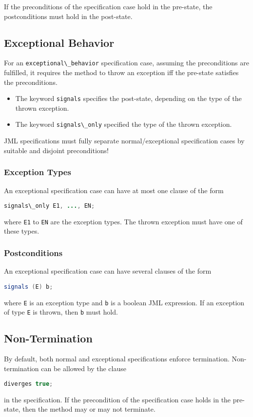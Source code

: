 \documentclass[a4paper, 11pt, accentcolor = tud3b]{tudreport}
\newcommand{\inlineJava}[1]{\lstinline[language = Java]|#1|}
\begin{document}
					If the preconditions of the specification case hold in the pre-state, the postconditions must hold in the post-state.

			\subsection{Exceptional Behavior}
				For an \inlineJava{exceptional\_behavior} specification case, assuming the preconditions are fulfilled, it requires the method to throw an exception iff the pre-state satisfies the preconditions.
				\begin{itemize}
					\item The keyword \inlineJava{signals} specifies the post-state, depending on the type of the thrown exception.
					\item The keyword \inlineJava{signals\_only} specified the type of the thrown exception.
				\end{itemize}
				JML specifications must fully separate normal/exceptional specification cases by suitable and disjoint preconditions!

				\subsubsection{Exception Types}
					An exceptional specification case can have at most one clause of the form
					\begin{center}
						\inlineJava{signals\_only E1, ..., EN;}
					\end{center}
					where \texttt{E1} to \texttt{EN} are the exception types. The thrown exception must have one of these types.

				\subsubsection{Postconditions}
					\label{sec:postcond2}
				
					An exceptional specification case can have several clauses of the form
					\begin{center}
						\inlineJava{signals (E) b;}
					\end{center}
					where \texttt{E} is an exception type and \texttt{b} is a boolean JML expression. If an exception of type \texttt{E} is thrown, then \texttt{b} must hold.

			\subsection{Non-Termination}
				By default, both normal and exceptional specifications enforce termination. Non-termination can be allowed by the clause
				\begin{center}
					\inlineJava{diverges true;}
				\end{center}
				in the specification. If the precondition of the specification case holds in the pre-state, then the method may or may not terminate.
\end{document}
